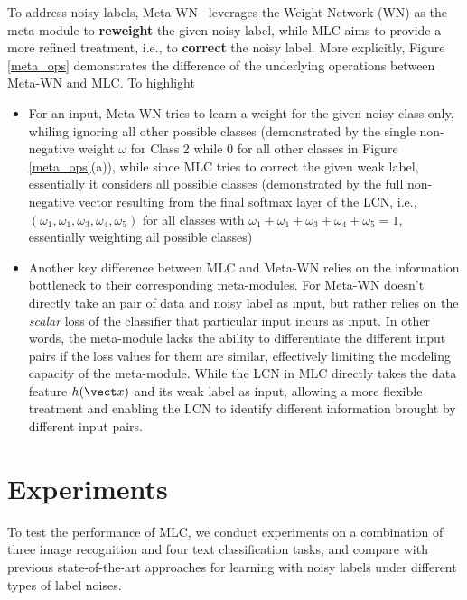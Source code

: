 To address noisy labels, Meta-WN~\cite{shu2019meta} leverages the
Weight-Network (WN) as the meta-module to \textbf{reweight} the given
noisy label, while MLC aims to provide a more refined treatment, i.e.,
to \textbf{correct} the noisy label. More explicitly, Figure
\ref{meta_ops} demonstrates the difference of the underlying
operations between Meta-WN and MLC. To highlight
\begin{itemize}
  \item For an input, Meta-WN tries to learn a weight for the given
    noisy class only, whiling ignoring all other possible classes
    (demonstrated by the single non-negative weight $\omega$ for Class
    2 while $0$ for all other classes in Figure \ref{meta_ops}(a)),
    while since MLC tries to correct the given weak label, essentially
    it considers all possible classes (demonstrated by the full
    non-negative vector resulting from the final softmax layer of the LCN,
    i.e., $(\omega_1, \omega_1, \omega_3, \omega_4, \omega_5)$ for all
    classes with $\omega_1+ \omega_1+ \omega_3+ \omega_4+ \omega_5=1$,
    essentially weighting all possible classes)
  \item Another key difference between MLC and Meta-WN relies on the
    information bottleneck to their corresponding meta-modules. For
    Meta-WN doesn't directly take an pair of data and noisy label as
    input, but rather relies on the \textit{scalar} loss of the
    classifier that particular input incurs as input. In other words,
    the meta-module lacks the ability to differentiate the different
    input pairs if the loss values for them are similar, effectively
    limiting the modeling capacity of the meta-module. While the LCN
    in MLC directly takes the data feature $h(\vect x)$ and its weak
    label as input, allowing a more flexible treatment and enabling
    the LCN to identify different information brought by different
    input pairs.
  \end{itemize}




\section{Experiments}
\label{sec:exp}

To test the performance of MLC, we conduct experiments on a
combination of three image recognition and four text classification
tasks, and compare with previous state-of-the-art approaches for
learning with noisy labels under different types of label noises.

